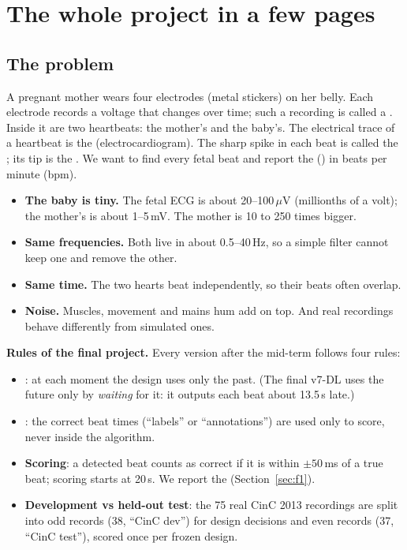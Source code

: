 \documentclass[11pt]{article}
\begin{document}
\section{The whole project in a few pages}
\label{sec:project}

\subsection{The problem}

A pregnant mother wears four electrodes (metal stickers) on her belly. Each electrode records a voltage that changes over time; such a recording is called a . Inside it are two heartbeats: the mother's and the baby's. The electrical trace of a heartbeat is the  (electrocardiogram). The sharp spike in each beat is called the ; its tip is the . We want to find every fetal beat and report the  () in beats per minute (bpm).

\begin{simple}
\begin{itemize}
  \item \textbf{The baby is tiny.} The fetal ECG is about 20--100\,$\mu$V (millionths of a volt); the mother's is about 1--5\,mV. The mother is 10 to 250 times bigger.
  \item \textbf{Same frequencies.} Both live in about 0.5--40\,Hz, so a simple filter cannot keep one and remove the other.
  \item \textbf{Same time.} The two hearts beat independently, so their beats often overlap.
  \item \textbf{Noise.} Muscles, movement and mains hum add on top. And real recordings behave differently from simulated ones.
\end{itemize}
\end{simple}

\textbf{Rules of the final project.} Every version after the mid-term follows four rules:
\begin{itemize}
  \item {}: at each moment the design uses only the past. (The final v7-DL uses the future only by \emph{waiting} for it: it outputs each beat about 13.5\,s late.)
  \item {}: the correct beat times (``labels'' or ``annotations'') are used only to score, never inside the algorithm.
  \item \textbf{Scoring}: a detected beat counts as correct if it is within $\pm 50$\,ms of a true beat; scoring starts at 20\,s. We report the  (Section~\ref{sec:f1}).
  \item \textbf{Development vs held-out test}: the 75 real CinC 2013 recordings are split into odd records (38, ``CinC dev'') for design decisions and even records (37, ``CinC test''), scored once per frozen design.
\end{itemize}
\end{document}
